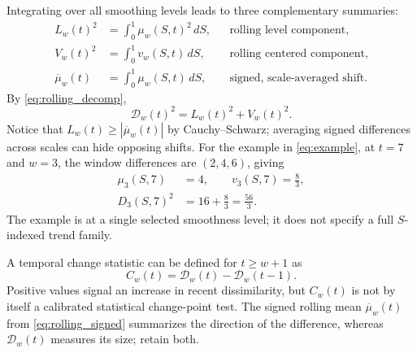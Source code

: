 \documentclass[10pt,letterpaper]{article}
\begin{document}
Integrating over all smoothing levels leads to three complementary
summaries:
\begin{align}
  L_w(t)^2&=\int_0^1\mu_w(S,t)^2\,dS,
      &&\text{rolling level component},\label{eq:rolling_level}\\
  V_w(t)^2&=\int_0^1v_w(S,t)\,dS,
      &&\text{rolling centered component},\label{eq:rolling_centered}\\
  \overline\mu_w(t)&=\int_0^1\mu_w(S,t)\,dS,
      &&\text{signed, scale-averaged shift}.\label{eq:rolling_signed}
\end{align}
By \eqref{eq:rolling_decomp},
\begin{equation}\label{eq:rolling_integrated_decomp}
  \mathcal D_w(t)^2=L_w(t)^2+V_w(t)^2.
\end{equation}
Notice that $L_w(t)\geq|\overline\mu_w(t)|$ by
Cauchy--Schwarz; averaging signed differences across scales can hide
opposing shifts. For the example in \eqref{eq:example}, at $t=7$
and $w=3$, the window differences are $(2,4,6)$, giving
\begin{equation}\label{eq:example_decomp}
\begin{aligned}
\mu_3(S,7)&=4,\qquad v_3(S,7)=\frac83,\\
D_3(S,7)^2&=16+\frac83=\frac{56}{3}.
\end{aligned}
\end{equation}
The example is at a single selected smoothness level; it does not
specify a full $S$-indexed trend family.

A temporal change statistic can be defined for $t\geq w+1$ as
\begin{equation}\label{eq:change}
  C_w(t)=\mathcal D_w(t)-\mathcal D_w(t-1).
\end{equation}
Positive values signal an increase in recent dissimilarity, but
$C_w(t)$ is not by itself a calibrated statistical change-point test.
The signed rolling mean $\overline\mu_w(t)$ from
\eqref{eq:rolling_signed} summarizes the direction of the difference,
whereas $\mathcal D_w(t)$ measures its size; retain both.
\end{document}
